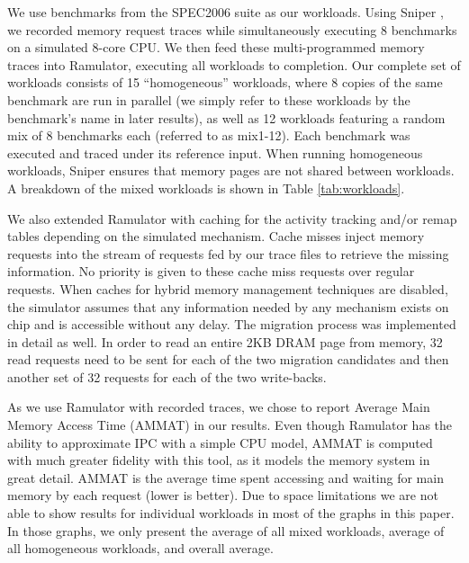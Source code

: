 We use benchmarks from the SPEC2006 suite \cite{spec} as our workloads. Using Sniper \cite{sniper}, we recorded memory request traces while simultaneously executing 8 benchmarks on a simulated 8-core CPU. We then feed these multi-programmed memory traces into Ramulator, executing all workloads to completion. Our complete set of workloads consists of 15 ``homogeneous'' workloads, where 8 copies of the same benchmark are run in parallel (we simply refer to these workloads by the benchmark's name in later results), as well as 12 workloads featuring a random mix of 8 benchmarks each (referred to as mix1-12). Each benchmark was executed and traced under its reference input. When running homogeneous workloads, Sniper ensures that memory pages are not shared between workloads. A breakdown of the mixed workloads is shown in Table \ref{tab:workloads}.



We also extended Ramulator with caching for the activity tracking and/or remap tables depending on the simulated mechanism. Cache misses inject memory requests into the stream of requests fed by our trace files to retrieve the missing information. No priority is given to these cache miss requests over regular requests. When caches for hybrid memory management techniques are disabled, the simulator assumes that any information needed by any mechanism exists on chip and is accessible without any delay. The migration process was implemented in detail as well. In order to read an entire 2KB DRAM page from memory, 32 read requests need to be sent for each of the two migration candidates and then another set of 32 requests for each of the two write-backs.

As we use Ramulator with recorded traces, we chose to report Average Main Memory Access Time (AMMAT) in our results. Even though Ramulator has the ability to approximate IPC with a simple CPU model, 
AMMAT is computed with much greater fidelity with this tool, as it models the memory system in great detail. AMMAT is the average time spent accessing and waiting for main memory by each request (lower is better). Due to space limitations we are not able to show results for individual workloads in most of the graphs in this paper. In those graphs, we only present the average of all mixed workloads, average of all homogeneous workloads, and overall average.

